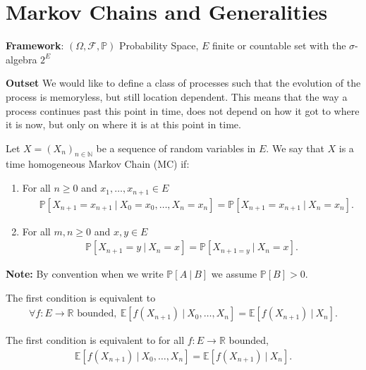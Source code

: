 \chapter{Markov Chains and Generalities}

\textbf{Framework}: $(\Omega, \mathcal{F}, \mathbb{P})$ Probability Space, $E$ finite or countable set with the $\sigma$-algebra $2^E$

\noindent
\textbf{Outset} We would like to define a class of processes such that the evolution of the process is memoryless, but still location dependent. This means that the way a process continues past this point in time, does not depend on how it got to where it is now, but only on where it is at this point in time. 

\begin{defn}
	Let $X=(X_n)_{n \in \mathbb{N}}$ be a sequence of random variables in $E$. We say that $X$ is a time homogeneous Markov Chain (MC) if:
\begin{enumerate}
	\item  For all $n \geq 0$ and $x_1,\ldots,x_{n+1} \in E$
\begin{align}
	\quad \boxed{\mathbb{P} \left[ X_{n+1}=x_{n+1} \ | \ X_0=x_0,\ldots,X_n=x_n \right] = \mathbb{P} \left[ X_{n+1}=x_{n+1} \ | \ X_n = x_n \right].}
\end{align}
	\item For all $m,n \geq 0$ and $x,y \in E$
\begin{align}	
	\boxed{\mathbb{P} \left[ X_{n+1}=y \ | \ X_{n}=x \right] = \mathbb{P} \left[ X_{n+1=y}\ | \ X_n=x \right].} 
\end{align}
\end{enumerate}

\end{defn}

\textbf{Note:} By convention when we write $\mathbb{P} \left[ A\ | \ B \right] $ we assume $\mathbb{P} \left[ B \right] >0$.

\begin{rmk}
The first condition is equivalent to
\begin{align}
	\forall f:E\to \mathbb{R}\textrm{ bounded},\ \mathbb{E} \left[ f(X_{n+1}) \ | \ X_0,\ldots,X_n \right] = \mathbb{E} \left[ f(X_{n+1}) \ | \ X_n \right] 
.\end{align}

\end{rmk}
{\color{blue}
\begin{rmk}
The first condition is equivalent to for all $f: E\to \mathbb{R}$ bounded,
\begin{align}
	\boxed{\mathbb{E} \left[ f(X_{n+1}) \ | \ X_0,\ldots,X_n \right] = \mathbb{E} \left[ f(X_{n+1}) \ | \ X_n \right].} 
\end{align}

\end{rmk}
}

